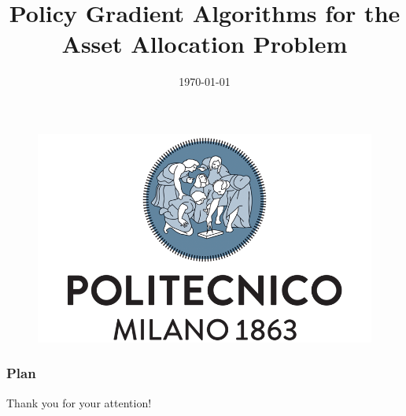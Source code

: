 \documentclass[11.5pt, aspectratio=169]{beamer}
\title[]{Policy Gradient Algorithms for the Asset Allocation Problem}
\author[P.\,Necchi]
{%
  \texorpdfstring{
    \begin{columns}%
      \column{1\linewidth}
      \centering
      Pierpaolo Necchi\\
      \href{mailto:pierpaolo.necchi@gmail.com}{pierpaolo.necchi@gmail.com}
    \end{columns}
  }
  {Pierpaolo Necchi}
}
\institute[Polimi] %
{%
}
\date{\today}
\begin{document}
\begin{frame}[plain]
	\begin{figure}[htpb]
		\centering
		\includegraphics[width=0.4\linewidth]{Images/polimi_name}
	\end{figure}
	\titlepage
\end{frame}





\begin{frame}
\frametitle{Plan} %
\tableofcontents %
\end{frame}







\begin{frame}[c]{}
  \begin{center}
	  \Huge Thank you for your attention!
  \end{center} 
\end{frame}


\appendix
\backupbegin

\begin{frame}
\frametitle{\refname}
\nocite{*}


\end{frame}



\backupend
\end{document}
